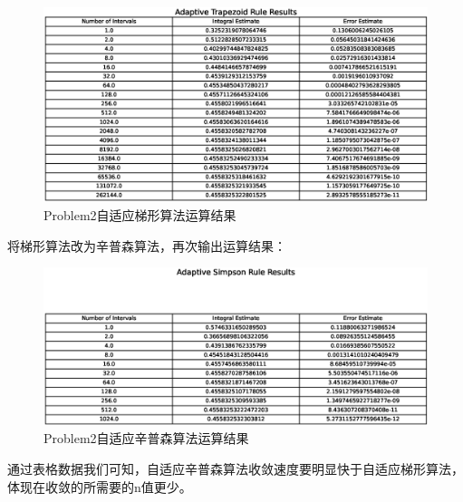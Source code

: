 \documentclass[12pt,a4paper]{article}%
\begin{document}
    \begin{figure}[H]%
        \centering
        \begin{minipage}{0.83\textwidth}%
            \centering
            \includegraphics[width=1.0%
            \textwidth]{Problem2.1}%
            \caption{\fontsize{10pt}{15pt}\selectfont Problem2自适应梯形算法运算结果}%
        \end{minipage}\label{fig:figure2}
    \end{figure}

    将梯形算法改为辛普森算法，再次输出运算结果：

    \begin{figure}[H]%
        \centering
        \begin{minipage}{0.83\textwidth}%
            \centering
            \includegraphics[width=1.0%
            \textwidth]{Problem2.2}%
            \caption{\fontsize{10pt}{15pt}\selectfont Problem2自适应辛普森算法运算结果}%
        \end{minipage}\label{fig:figure3}
    \end{figure}

    通过表格数据我们可知，自适应辛普森算法收敛速度要明显快于自适应梯形算法，体现在收敛的所需要的n值更少。
\end{document}
